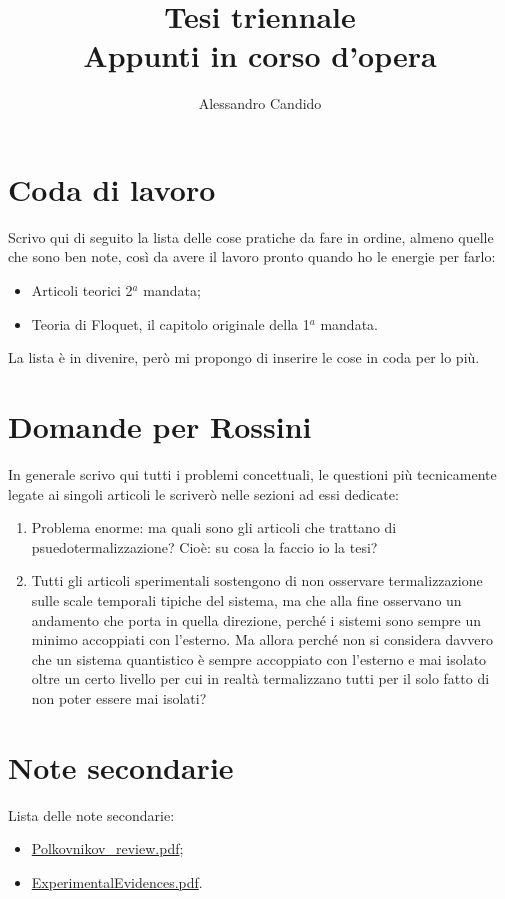 \documentclass[a4paper,10pt]{article}
\title{Tesi triennale\\ Appunti in corso d'opera}
\author{Alessandro Candido}
\begin{document}
\maketitle
\tableofcontents

\section{Coda di lavoro}
Scrivo qui di seguito la lista delle cose pratiche da fare in ordine, almeno quelle che sono ben note, così da avere il lavoro pronto quando ho le energie per farlo:

\begin{itemize}
	\item Articoli teorici 2$^a$ mandata;
	\item Teoria di Floquet, il capitolo originale della 1$^a$ mandata.
\end{itemize}

La lista è in divenire, però mi propongo di inserire le cose in coda per lo più.

\section{Domande per Rossini}
In generale scrivo qui tutti i problemi concettuali, le questioni più tecnicamente legate ai singoli articoli le scriverò nelle sezioni ad essi dedicate:

\begin{enumerate}
	\item Problema enorme: ma quali sono gli articoli che trattano di psuedotermalizzazione? Cioè: su cosa la faccio io la tesi?
	\item Tutti gli articoli sperimentali sostengono di non osservare termalizzazione sulle scale temporali tipiche del sistema, ma che alla fine osservano un andamento che porta in quella direzione, perché i sistemi sono sempre un minimo accoppiati con l'esterno. Ma allora perché non si considera davvero che un sistema quantistico è sempre accoppiato con l'esterno e mai isolato oltre un certo livello per cui in realtà termalizzano tutti per il solo fatto di non poter essere mai isolati?
\end{enumerate}

\section{Note secondarie}
Lista delle note secondarie:

\begin{itemize}
	\item \href{./Polkovnikov_review.pdf}{Polkovnikov\_review.pdf};
	\item \href{./ExperimentalEvidences.pdf}{ExperimentalEvidences.pdf}.
\end{itemize}
\end{document}
